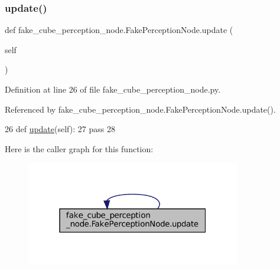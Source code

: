 \subsubsection{\texorpdfstring{update()}{update()}\hspace{0.1cm}{\footnotesize\ttfamily [2/3]}}
{\footnotesize\ttfamily def fake\+\_\+cube\+\_\+perception\+\_\+node.\+Fake\+Perception\+Node.\+update (\begin{DoxyParamCaption}\item[{}]{self }\end{DoxyParamCaption})}



Definition at line 26 of file fake\+\_\+cube\+\_\+perception\+\_\+node.\+py.



Referenced by fake\+\_\+cube\+\_\+perception\+\_\+node.\+Fake\+Perception\+Node.\+update().


\begin{DoxyCode}
26     \textcolor{keyword}{def }\hyperlink{classfake__cube__perception__node_1_1FakePerceptionNode_ae73741e7f84f057cbf109698e70a2515}{update}(self):
27         \textcolor{keywordflow}{pass}
28 
\end{DoxyCode}
Here is the caller graph for this function\+:
\nopagebreak
\begin{figure}[H]
\begin{center}
\leavevmode
\includegraphics[width=265pt]{classfake__cube__perception__node_1_1FakePerceptionNode_ae73741e7f84f057cbf109698e70a2515_icgraph}
\end{center}
\end{figure}
\mbox{\label{classfake__cube__perception__node_1_1FakePerceptionNode_ae73741e7f84f057cbf109698e70a2515}} 
